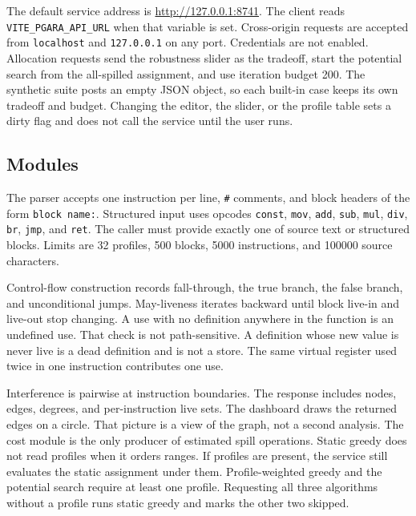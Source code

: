 \documentclass{ieeeaccess}
\begin{document}


The default service address is \url{http://127.0.0.1:8741}.
The client reads \texttt{VITE\_PGARA\_API\_URL} when that variable is set.
Cross-origin requests are accepted from \texttt{localhost} and \texttt{127.0.0.1} on any port.
Credentials are not enabled.
Allocation requests send the robustness slider as the tradeoff, start the potential search from the all-spilled assignment, and use iteration budget 200.
The synthetic suite posts an empty JSON object, so each built-in case keeps its own tradeoff and budget.
Changing the editor, the slider, or the profile table sets a dirty flag and does not call the service until the user runs.

\subsection{Modules}
\label{sec:modules}
The parser accepts one instruction per line, \texttt{\#} comments, and block headers of the form \texttt{block name:}.
Structured input uses opcodes \texttt{const}, \texttt{mov}, \texttt{add}, \texttt{sub}, \texttt{mul}, \texttt{div}, \texttt{br}, \texttt{jmp}, and \texttt{ret}.
The caller must provide exactly one of source text or structured blocks.
Limits are 32 profiles, 500 blocks, 5000 instructions, and 100000 source characters.

Control-flow construction records fall-through, the true branch, the false branch, and unconditional jumps.
May-liveness iterates backward until block live-in and live-out stop changing.
A use with no definition anywhere in the function is an undefined use.
That check is not path-sensitive.
A definition whose new value is never live is a dead definition and is not a store.
The same virtual register used twice in one instruction contributes one use.

Interference is pairwise at instruction boundaries.
The response includes nodes, edges, degrees, and per-instruction live sets.
The dashboard draws the returned edges on a circle.
That picture is a view of the graph, not a second analysis.
The cost module is the only producer of estimated spill operations.
Static greedy does not read profiles when it orders ranges.
If profiles are present, the service still evaluates the static assignment under them.
Profile-weighted greedy and the potential search require at least one profile.
Requesting all three algorithms without a profile runs static greedy and marks the other two skipped.
\end{document}
